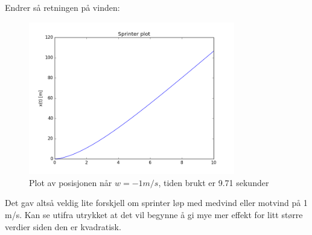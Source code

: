\documentclass[a4paper,norsk,12pt]{article}
\begin{document}
Endrer så retningen på vinden:



\begin{figure}[H]
  \includegraphics[width=90mm]{sprinter05.png}
  \caption{Plot av posisjonen når $w = -1 m/s$, tiden brukt er 9.71 sekunder }
  \label{fig:plot8}
\end{figure}

\noindent
Det gav altså veldig lite forskjell om sprinter løp med medvind eller motvind på 1 m/s. Kan se utifra utrykket at det vil begynne å gi mye mer effekt for litt større verdier siden den er kvadratisk.
\end{document}
